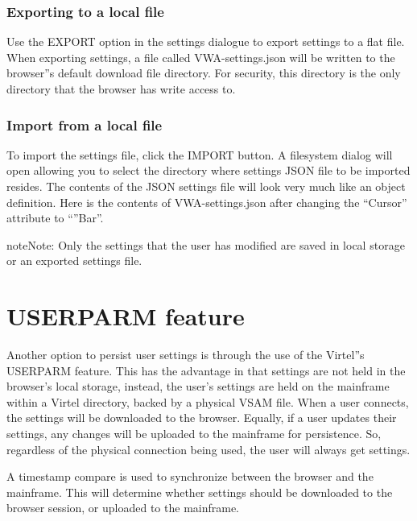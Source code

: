\documentclass[letterpaper,10pt,english]{sphinxmanual}
\begin{document}
\subsection{Exporting to a local file}
\label{\detokenize{TN202002:exporting-to-a-local-file}}
Use the EXPORT option in the settings dialogue to export settings to a flat file. When exporting settings, a file called VWA-settings.json will be written to the browser”s default download file directory. For security, this directory is the only directory that the browser has write access to.


\subsection{Import from a local file}
\label{\detokenize{TN202002:import-from-a-local-file}}
To import the settings file, click the IMPORT button. A filesystem dialog will open allowing you to select the directory where settings JSON file to be imported resides.
The contents of the JSON settings file will look very much like an object definition. Here is the contents of VWA-settings.json after changing the “Cursor” attribute to “”Bar”.


\begin{sphinxadmonition}{note}{Note:}
Only the settings that the user has modified are saved in local storage or an exported settings file.
\end{sphinxadmonition}


\chapter{USERPARM feature}
\label{\detokenize{TN202002:userparm-feature}}
Another option to persist user settings is through the use of the Virtel”s USERPARM feature. This has the advantage in that settings are not held in the browser’s local storage, instead, the user’s settings are held on the mainframe within a Virtel directory, backed by a physical VSAM file. When a user connects, the settings will be downloaded to the browser. Equally, if a user updates their settings, any changes will be uploaded to the mainframe for persistence. So, regardless of the physical connection being used, the user will always get  settings.

A timestamp compare is used to synchronize between the browser and the mainframe. This will determine whether settings should be downloaded to the browser session, or uploaded to the mainframe.
\end{document}
